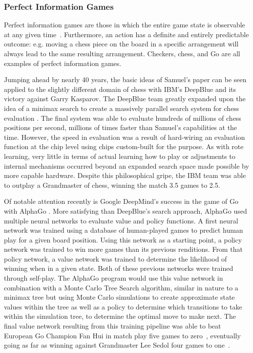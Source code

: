 

\subsubsection*{Perfect Information Games}

Perfect information games are those in which the entire game state is observable
at any given time~\cite{perfinfo}.
%
Furthermore,
an action has a definite and entirely predictable outcome:
e.g. moving a chess piece on the board in a specific arrangement will always
lead to the same resulting arrangement.
%
Checkers, chess, and Go are all examples of perfect information games.

Jumping ahead by nearly 40 years,
the basic ideas of Samuel's paper can be seen applied to the slightly different
domain of chess with IBM's DeepBlue
and its victory against Garry Kasparov.
%
The DeepBlue team greatly expanded upon the idea of a minimax search to create a
massively parallel search system for chess evaluation
\cite{ibm_deepblue}.
%
The final system was able to evaluate hundreds of millions of chess positions
per second,
millions of times faster than Samuel's capabilities at the time.
%
However,
the speed in evaluation was a result of hard-wiring an evaluation function at
the chip level using chips custom-built for the purpose.
%
As with rote learning,
very little in terms of actual learning how to play or adjustments to internal
mechanisms occurred
beyond an expanded search space made possible by more capable hardware.
%
Despite this philosophical gripe,
the IBM team was able to outplay a Grandmaster of chess,
winning the match 3.5 games to 2.5.


Of notable attention recently is Google DeepMind's
success in the game of Go with AlphaGo
\cite{deepmind_alphago}.
%
More satisfying than DeepBlue's search approach,
AlphaGo used multiple neural networks to evaluate value and policy functions.
%
A first neural network was trained using a database of human-played games
to predict human play for a given board position.
%
Using this network as a starting point,
a policy network was trained to win more games than its previous renditions.
%
From that policy network,
a value network was trained to determine the likelihood of winning when in a
given state.
%
Both of these previous networks were trained through self-play.
%
The AlphaGo program would use this value network in combination with a
Monte Carlo Tree Search algorithm,
similar in nature to a minimax tree
but using Monte Carlo simulations to create approximate state values within the
tree as well as a policy to determine which transitions to take within the
simulation tree,
to determine the optimal move to make next.
%
The final value network resulting from this training pipeline was able to beat
European Go Champion Fan Hui in match play
five games to zero~\cite{deepmind_alphago},
eventually going as far as winning against
Grandmaster Lee Sedol four games to one~\cite{deepmind_overview}.

